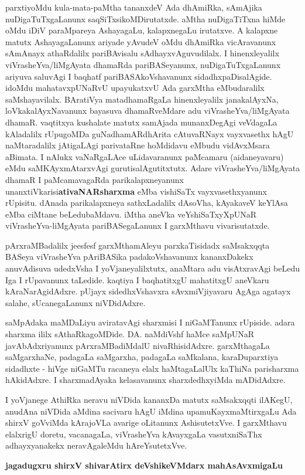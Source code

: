 parxtiyoMdu kula-mata-paMtha tananxdeV Ada dhAmiRka, sAmAjika nuDigaTuTxgaLanunx saqSiTxsikoMDirutatxde. aMtha nuDigaTiTxna hiMde oMdu iDiV paraMpareya AshayagaLu, kalapxnegaLu irutatxve. A kalapxne matutx AshayagaLanunx ariyade yAvudeV oMdu dhAmiRka vicAravanunx sAmAnayx athaRdalilx pariBAvisalu sAdhayxvAguvudilalx. I hinenxleyalilx viVrasheYva/liMgAyata dhamaRda pariBASe\-yanunx, nuDigaTuTxgaLanunx ariyuva saluvAgi I baqhatf pariBASAkoVshavanunx sidadhxpaDisalAgide. idoMdu mahatavxpUNaRvU upayukatxvU Ada garxMtha eMbudaralilx saMshayavilalx. BAratiVya matadhamaRgaLa hinenxleyalilx janakalAyxNa, loVkakalAyxNa\-vanunx bayasuva dhamaRveMdare adu viVrasheYva/liMgAyata dhamaR. vaqtitxya kushalate matutx samAjada munanxDegAgi veVdagaLa kAladalilx rUpugoMDa guNadhamARdhArita cAtuvaRNayx vayxvasethx hAgU naMtaradalilx jAtigaLAgi parivataRne hoMdidavu eMbudu \hbox{vidAvxMsara} aBimata. I nAlukx vaNaRgaLAce uLidavaranunx paMcamaru (aidaneyavaru) eMdu saMKAyxmAtarxvAgi gurutisalAgutitxtutx. Adare viVrasheYva/liMgAyata dhamaR I paMcamavagaRda parikalapxneyanunx unanxtiVkarisi\break \textbf{ativaNARsharxma} eMba vishiSaTx vayxvasethxyanunx rUpisitu. dAnada parikalapxneya sathxLadalilx dAsoVha, kAyakaveV keYlAsa eMba ciMtane beLedubaMdavu. iMtha aneVka veYshiSaTxyXpUNaR viVrasheYva-liMgAyata pariBASegaLanunx I garxMthavu vivarisutatxde.

\medskip

pArxraMBadalilx jeesfesf garxMthamAleyu parxkaTisidadx saMsakxqqta BASeya viVrasheYva pAriBASika padakoVshavanunx kananxDakekx anuvAdisuva udedxVsha I yoVjaneyalilxtutx, anaMtara adu visAtxravAgi beLedu Iga I rUpavanunx taLedide. kaqtiya I baqhatitxgU mahatitxgU aneVkaru kAraNarAgidAdxre. pUjayx sidedhxVshavxra sAvxmiVjiyavaru AgAga agatayx salahe, sUcanegaLanunx niVDidAdxre.

\medskip

saMpAdaka maMDaLiyu aviratavAgi sharxmisi I niGaMTanunx rUpiside. adara sharxma ililx sAthaRkagoMDide. DA. naMdiVshf haMce saMpUNaR javAbAdxriyanunx pArxraMBadiMdalU nivaRhisidAdxre. garxMthagaLa saMgarxhaNe, padagaLa saMgarxha, padagaLa saMkalana, karaDuparxtiya sidadhxte - hiVge niGaMTu racaneya elalx haMtagaLalUlx kaThiNa parisharxma hAkidAdxre. I sharxmadAyaka kelasavanunx sharxdedhxyiMda mADidAdxre. 
\medskip

I yoVjanege AthiRka neravu niVDida kananxDa matutx saMsakxqqti ilAKegU, anudAna niVDida aMdina sacivaru hAgU iMdina upamuKayxmaMtirxgaLu Ada shirxV goVviMda kArajoVLa avarige oLitanunx AshisutetxVve. I garxMthavu elalxrigU doretu, vacanagaLa, viVrasheYva kAvayxgaLa vasutxniSaThx adhayxyanakekx neravAgaleMdu hAreYsutetxVve.

\vskip 1cm

\hfill {\large\bf jagadugxru shirxV shivarAtirx deVshikeVMdarx mahAsAvxmigaLu}
